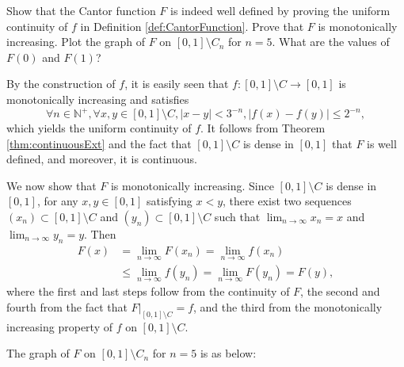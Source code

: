 \begin{exc}
  \label{exc:CantorFuncWellDefined}
  Show that the Cantor function $F$
  is indeed well defined
  by proving the uniform continuity
  of $f$ in Definition \ref{def:CantorFunction}.
  Prove that $F$ is monotonically increasing.
  Plot the graph of $F$
  on $[0,1]\setminus C_n$ for $n=5$. 
  What are the values of $F(0)$ and $F(1)$?
\end{exc}
\begin{solution}
  By the construction of $f$,
  it is easily seen that
  $f: [0, 1]\setminus C\rightarrow [0, 1]$ is monotonically increasing
  and satisfies
  \begin{equation*}
    \forall n\in \mathbb{N}^+,
    \forall x, y\in [0, 1]\setminus C,
    |x - y| < 3^{-n},
    |f(x) - f(y)| \le 2^{-n},
  \end{equation*}
  which yields the uniform continuity of $f$.
  It follows from Theorem \ref{thm:continuousExt} and
  the fact that $[0, 1]\setminus C$ is dense in $[0, 1]$
  that $F$ is well defined,
  and moreover,
  it is continuous.

  We now show that $F$ is monotonically increasing.
  Since $[0, 1]\setminus C$ is dense in $[0, 1]$,
  for any $x, y\in [0, 1]$ satisfying $x < y$,
  there exist two sequences $(x_n)\subset [0, 1]\setminus C$ and
  $(y_n)\subset [0, 1]\setminus C$ such that
  $\lim_{n\rightarrow \infty}x_n = x$ and $\lim_{n\rightarrow \infty}y_n = y$.
  Then
  \begin{align*}
    F(x) &= \lim_{n\rightarrow \infty}F(x_n) = \lim_{n\rightarrow \infty} f(x_n) \\
           &\le \lim_{n\rightarrow \infty}f(y_n) =  \lim_{n\rightarrow \infty} F(y_n) = F(y),
  \end{align*}
  where the first and last steps follow from the continuity of $F$,
  the second and fourth from the fact that $F|_{[0, 1]\setminus C} = f$,
  and the third from the monotonically increasing property of $f$
  on $[0, 1]\setminus C$.

  The graph of $F$ on $[0, 1]\setminus C_n$ for $n=5$ is as below:
  \begin{center}
\end{center}
\end{solution}
